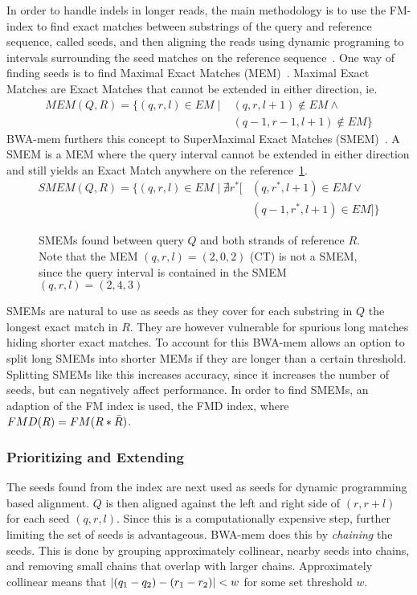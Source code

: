 In order to handle indels in longer reads, the main methodology is to use the FM-index to find exact matches between substrings of the query and reference sequence, called seeds, and then aligning the reads using dynamic programing to intervals surrounding the seed matches on the reference sequence~\cite{bowtie2}.
One way of finding seeds is to find Maximal Exact Matches (MEM)~\cite{longmem}.
Maximal Exact Matches are Exact Matches that cannot be extended in either direction, ie. 
\begin{align*}
  MEM(Q, R) = \{(q, r, l) \in EM \mid &(q, r, l+1) \notin EM \wedge \\
  & (q-1, r-1, l+1) \notin EM \}
\end{align*}
BWA-mem furthers this concept to SuperMaximal Exact Matches (SMEM)~\cite{origsmem}.
A SMEM is a MEM where the query interval cannot be extended in either direction and still yields an Exact Match anywhere on the reference~\ref{fig:smem}.
\begin{align*}
  SMEM(Q, R) = \{(q, r, l) \in EM \mid \nexists r^*[&(q, r^*, l+1) \in EM \vee\\
    &(q-1, r^*, l+1) \in EM] \}
\end{align*}
\begin{figure}
  \tikzpicture
  
  \endtikzpicture
  \caption{SMEMs found between query $Q$ and both strands of reference $R$. Note that the MEM $(q, r, l)=(2, 0, 2)$ (CT) is not a SMEM, since the query interval is contained in the SMEM $(q, r, l) = (2, 4, 3)$}
  \label{fig:smem}
\end{figure}

SMEMs are natural to use as seeds as they cover for each substring in $Q$ the longest exact match in $R$.
They are however vulnerable for spurious long matches hiding shorter exact matches.
To account for this BWA-mem allows an option to split long SMEMs into shorter MEMs if they are longer than a certain threshold.
Splitting SMEMs like this increases accuracy, since it increases the number of seeds, but can negatively affect performance. 
In order to find SMEMs, an adaption of the FM index is used, the FMD index, where $FMD(R) = FM(R * \bar{R})$.

\subsubsection{Prioritizing and Extending}
The seeds found from the index are next used as seeds for dynamic programming based alignment.
$Q$ is then aligned against the left and right side of $(r, r+l)$ for each seed $(q, r, l)$.
Since this is a computationally expensive step, further limiting the set of seeds is advantageous.
BWA-mem does this by \emph{chaining} the seeds.
This is done by grouping approximately collinear, nearby seeds into chains, and removing small chains that overlap with larger chains.
Approximately collinear means that $\left | (q_1-q_2) -(r_1-r_2) \right |<w$ for some set threshold $w$.

